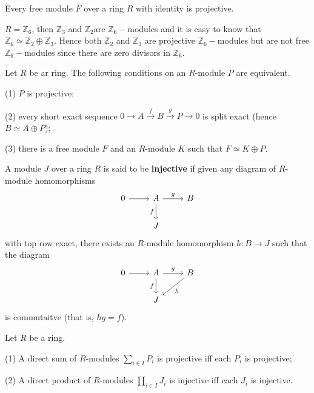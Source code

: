 \documentclass{article}
\begin{document}
\begin{theorem}
    Every free module $F$ over a ring $R$ with identity is projective.
\end{theorem}
\begin{example}
    $R=\mathbb{Z}_{6}$, then $\mathbb{Z}_{3}$ and $\mathbb{Z}_{2}$are $\mathbb{Z}_{6}-$modules and it is easy to know that $\mathbb{Z}_{6}\simeq \mathbb{Z}_{2}\oplus \mathbb{Z}_{3}$. Hence both $\mathbb{Z}_{2}$ and $\mathbb{Z}_{3}$ are projective $\mathbb{Z}_{6}-$modules but are not free $\mathbb{Z}_{6}-$modules since there are zero divisors in $\mathbb{Z}_{6}$.
\end{example}

\begin{theorem}
    Let $R$ be ar ring. The following conditions on an $R$-module $P$ are equivalent.

    (1) $P$ is projective;

    (2) every short exact sequence $0\to A\xrightarrow{f}B\xrightarrow{g}P\to 0$ is split exact (hence $B\simeq A \oplus P$);

    (3) there is a free module $F$ and an $R$-module $K$ such that $F\simeq K\oplus P$.
\end{theorem}

\begin{definition}
    A module $J$ over a ring $R$ is said to be \textbf{injective} if given any diagram of $R$-module homomorphisms 
    $$\begin{tikzcd}
0 \arrow[r] & A \arrow[r, "g"] \arrow[d, "f"'] & B \\
            & J                                &  
\end{tikzcd}$$
with top row exact, there exists an $R$-module homomorphism $h:B\to J$ such that the diagram
$$\begin{tikzcd}
0 \arrow[r] & A \arrow[r, "g"] \arrow[d, "f"'] & B \arrow[ld, "h"] \\
            & J                                &                  
\end{tikzcd}$$
is commutaitve (that is, $hg=f$).
\end{definition}

\begin{theorem}
    Let $R$ be a ring. 

    (1) A direct sum of $R$-modules $\sum_{i\in I}P_i$ is projective iff each $P_i$ is projective;

    (2) A direct product of $R$-modules $\prod_{i\in I}J_{i}$ is injective iff each $J_{i}$ is injective.
\end{theorem}
\end{document}
